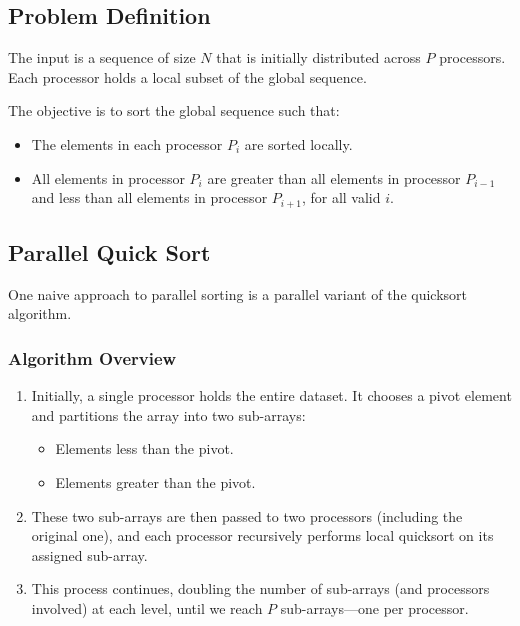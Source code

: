 \documentclass[12pt]{book}
\begin{document}
\subsection*{Problem Definition}

The input is a sequence of size $N$ that is initially distributed across $P$ processors. Each processor holds a local subset of the global sequence.

The objective is to sort the global sequence such that:
\begin{itemize}
    \item The elements in each processor $P_i$ are sorted locally.
    \item All elements in processor $P_i$ are greater than all elements in processor $P_{i-1}$ and less than all elements in processor $P_{i+1}$, for all valid $i$.
\end{itemize}

\subsection{Parallel Quick Sort}

One naive approach to parallel sorting is a parallel variant of the quicksort algorithm.

\subsubsection*{Algorithm Overview}

\begin{enumerate}
    \item Initially, a single processor holds the entire dataset. It chooses a pivot element and partitions the array into two sub-arrays:
    \begin{itemize}
        \item Elements less than the pivot.
        \item Elements greater than the pivot.
    \end{itemize}
    
    \item These two sub-arrays are then passed to two processors (including the original one), and each processor recursively performs local quicksort on its assigned sub-array.

    \item This process continues, doubling the number of sub-arrays (and processors involved) at each level, until we reach $P$ sub-arrays—one per processor.
\end{enumerate}
\end{document}
